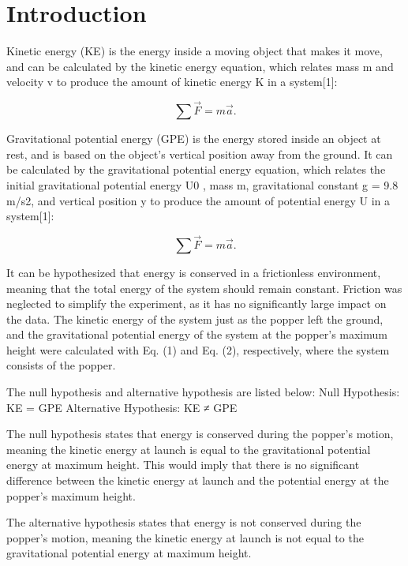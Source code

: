 \documentclass[amsmath,amssymb,aps,endfloats,linenumbers]{revtex4-2}
\begin{document}
\section{Introduction}
Kinetic energy (KE) is the energy inside a moving object that makes it move, and can be calculated by the kinetic energy equation, which relates mass m and velocity v to produce the amount of kinetic energy K in a system[1]:

\begin{equation}
\sum \vec{F} = m \vec{a}.
\label{eq:fma} %
\end{equation}

Gravitational potential energy (GPE) is the energy stored inside an object at rest, and is based on the object's vertical position away from the ground. It can be calculated by the gravitational potential energy equation, which relates the initial gravitational potential energy U0 , mass m, gravitational constant g = 9.8 m/s2, and vertical position y to produce the amount of potential energy U in a system[1]:

\begin{equation}
\sum \vec{F} = m \vec{a}.
\label{eq:fma} %
\end{equation}

It can be hypothesized that energy is conserved in a frictionless environment, meaning that the total energy of the system should remain constant. Friction was neglected to simplify the experiment, as it has no significantly large impact on the data. The kinetic energy of the system just as the popper left the ground, and the gravitational potential energy of the system at the popper's maximum height were calculated with Eq. (1) and Eq. (2), respectively, where the system consists of the popper.

The null hypothesis and alternative hypothesis are listed below:
Null Hypothesis: KE = GPE
Alternative Hypothesis: KE ≠ GPE

The null hypothesis states that energy is conserved during the popper’s motion, meaning the kinetic energy at launch is equal to the gravitational potential energy at maximum height. This would imply that there is no significant difference between the kinetic energy at launch and the potential energy at the popper’s maximum height.

The alternative hypothesis states that energy is not conserved during the popper’s motion, meaning the kinetic energy at launch is not equal to the gravitational potential energy at maximum height.
\end{document}
